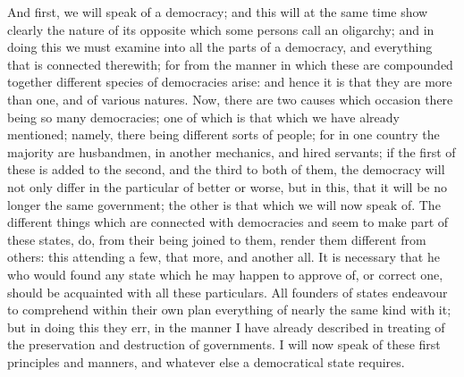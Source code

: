 And first, we will speak of a democracy; and this will at the same time
show clearly the nature of its opposite which some persons call an
oligarchy; and in doing this we must examine into all the parts of a
democracy, and everything that is connected therewith; for from the manner
in which these are compounded together different species of democracies
arise: and hence it is that they are more than one, and of various
natures. Now, there are two causes which occasion there being so many
democracies; one of which is that which we have already mentioned; namely,
there being different sorts of people; for in one country the majority are
husbandmen, in another mechanics, and hired servants; if the first of
these is added to the second, and the third to both of them, the democracy
will not only differ in the particular of better or worse, but in this,
that it will be no longer the same government; the other is that which we
will now speak of. The different things which are connected with
democracies and seem to make part of these states, do, from their being
joined to them, render them different from others: this attending a few,
that more, and another all. It is necessary that he who would found any
state which he may happen to approve of, or correct one, should be
acquainted with all these particulars. All founders of states endeavour to
comprehend within their own plan everything of nearly the same kind with
it; but in doing this they err, in the manner I have already described in
treating of the preservation and destruction of governments. I will now
speak of these first principles and manners, and whatever else a
democratical state requires.


